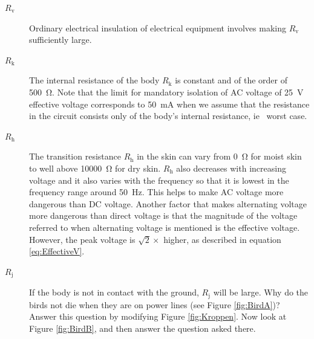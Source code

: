 \documentclass[../Elmag-labhefte-2020.tex]{subfiles}
\begin{document}
\begin{description}
    \item [$R_\text{v}$] Ordinary electrical insulation of electrical equipment involves making $R_\text{v}$ sufficiently large.
    
    
    \item [$R_\text{k}$] The internal resistance of the body $R_\text{k}$ is constant and of the order of \SI{500}{\ohm}. Note that the limit for mandatory isolation of AC voltage of \SI{25}{\V} effective voltage corresponds to \SI{50}{\milli\ampere} when we assume that the resistance in the circuit consists only of the body's internal resistance, ie \ worst case.
    \item [$R_\text{h}$] The transition resistance $R_\text{h}$ in the skin can vary from \SI{0}{\ohm} for moist skin to well above \SI{10000}{\ohm} for dry skin. $R_\text{h}$ also decreases with increasing voltage and it also varies with the frequency so that it is lowest in the frequency range around \SI{50}{\hertz}. This helps to make AC voltage more dangerous than DC voltage. Another factor that makes alternating voltage more dangerous than direct voltage is that the magnitude of the voltage referred to when alternating voltage is mentioned is the effective voltage. However, the peak voltage is $\sqrt{2} \times $ higher, as described in equation \eqref{eq:EffectiveV}.
    \item [$R_\text{j}$] If the body is not in contact with the ground, $R_\text{j}$ will be large. Why do the birds not die when they are on power lines (see Figure \ref{fig:BirdA})? Answer this question by modifying Figure \ref{fig:Kroppen}. Now look at Figure \ref{fig:BirdB}, and then answer the question asked there.
\end{description}
\end{document}
